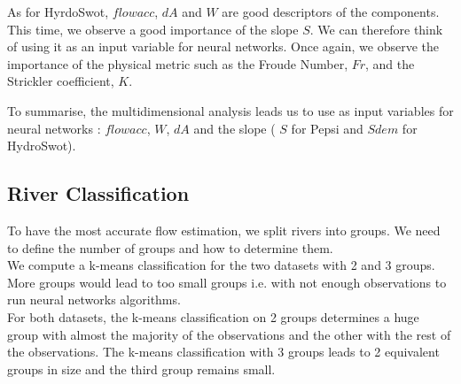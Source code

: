 As for HyrdoSwot, $flowacc$, $dA$ and $W$ are good descriptors of the components. This time, we observe a good importance of the slope $S$. We can therefore think of using it as an input variable for neural networks. Once again, we observe the importance of the physical metric such as the Froude Number, $Fr$, and the Strickler coefficient, $K$. 

To  summarise, the multidimensional analysis leads us to use as input variables for neural networks : $flowacc$, $W$, $dA$ and the slope ( $S$ for Pepsi and $Sdem$ for HydroSwot). 

\subsection{River Classification} 

To have the most accurate flow estimation, we split rivers into groups. We need to define the number of groups and how to determine them. \\

We compute a k-means classification for the two datasets with 2 and 3 groups. More groups would lead to too small groups i.e. with not enough observations to run neural networks algorithms. \\
For both datasets, the k-means classification on 2 groups determines a huge group with almost the majority of the observations and the other with the rest of the observations. The k-means classification with 3 groups leads to 2 equivalent groups in size and the third group remains small.\\

